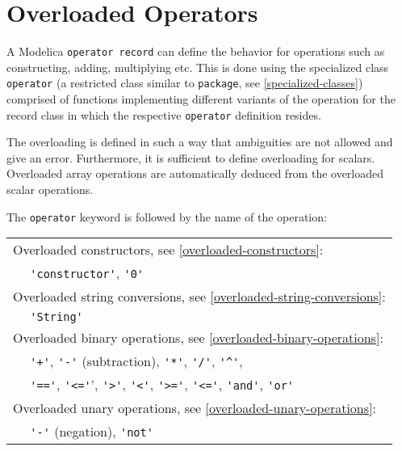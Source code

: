 \chapter{Overloaded Operators}

A Modelica \lstinline!operator record! can define the behavior for
operations such as constructing, adding, multiplying etc. This is done
using the specialized class \lstinline!operator! (a restricted class
similar to \lstinline!package!, see \autoref{specialized-classes}) comprised of functions
implementing different variants of the operation for the record class in
which the respective \lstinline!operator! definition resides.

\begin{nonnormative}
The overloading is defined in such a way that ambiguities are not allowed and give an error.  Furthermore, it is sufficient to define overloading for scalars.
Overloaded array operations are automatically deduced from the overloaded scalar operations.
\end{nonnormative}

The \lstinline!operator! keyword is followed by the name of the operation:
%
\begin{longtable}[c]{@{}|ll|@{}}
\hline\endhead
\multicolumn{2}{|l|}{Overloaded constructors, see \autoref{overloaded-constructors}:}\\
& \lstinline!'constructor'!, \lstinline!'0'!\\
\multicolumn{2}{|l|}{Overloaded string conversions, see \autoref{overloaded-string-conversions}:}\\
& \lstinline!'String'! \\
\multicolumn{2}{|l|}{Overloaded binary operations, see \autoref{overloaded-binary-operations}:}\\
& \lstinline!'+'!, \lstinline!'-'! (subtraction), \lstinline!'*'!, \lstinline!'/'!, \lstinline!'^'!,\\
& \lstinline!'=='!, \lstinline!'<='!', \lstinline!'>'!, \lstinline!'<'!,
\lstinline!'>='!, \lstinline!'<='!, \lstinline!'and'!, \lstinline!'or'!\\
\multicolumn{2}{|l|}{Overloaded unary operations, see \autoref{overloaded-unary-operations}:}\\
& \lstinline!'-'! (negation), \lstinline!'not'!\\
\hline
\end{longtable}

